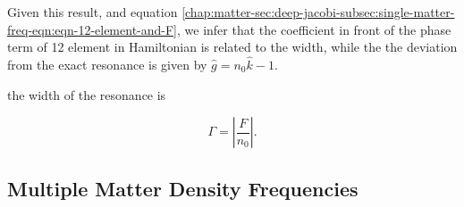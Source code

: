 Given this result, and equation \ref{chap:matter-sec:deep-jacobi-subsec:single-matter-freq-eqn:eqn-12-element-and-F}, we infer that the coefficient in front of the phase term of 12 element in Hamiltonian is related to the width, while the the deviation from the exact resonance is given by $\hat g=n_0 \hat k - 1$.




  the width of the resonance is

 \begin{equation}
 \Gamma = \left\lvert \frac{F}{n_0} \right\rvert.
 \label{chap:matter-sec:deep-jacobi-eqn:single-frequency-width-guessing}
 \end{equation}




















\subsection{\label{chap:matter-sec:deep-jacobi-subsec:multi-matter-freq}Multiple Matter Density Frequencies}

